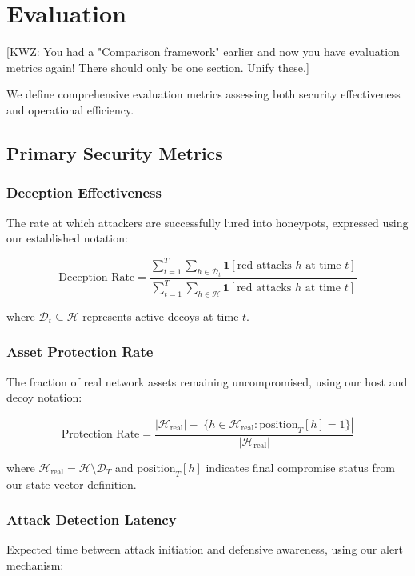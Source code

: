 \documentclass[12pt,oneside]{article}
\newcommand{\kwz}[1]{
  {\color{magenta} [KWZ: {#1}]}
 }
\begin{document}
\section{Evaluation}

\kwz{You had a "Comparison framework" earlier and now you have evaluation metrics again! There should only be one section. Unify these.}

We define comprehensive evaluation metrics assessing both security effectiveness and operational efficiency.

\subsection{Primary Security Metrics}

\subsubsection{Deception Effectiveness}
The rate at which attackers are successfully lured into honeypots, expressed using our established notation:

\begin{equation}
\text{Deception Rate} = \frac{\sum_{t=1}^{T} \sum_{h \in \mathcal{D}_t} \mathbf{1}[\text{red attacks } h \text{ at time } t]}{\sum_{t=1}^{T} \sum_{h \in \mathcal{H}} \mathbf{1}[\text{red attacks } h \text{ at time } t]}
\end{equation}

where $\mathcal{D}_t \subseteq \mathcal{H}$ represents active decoys at time $t$.

\subsubsection{Asset Protection Rate}
The fraction of real network assets remaining uncompromised, using our host and decoy notation:

\begin{equation}
\text{Protection Rate} = \frac{|\mathcal{H}_{\text{real}}| - |\{h \in \mathcal{H}_{\text{real}} : \text{position}_T[h] = 1\}|}{|\mathcal{H}_{\text{real}}|}
\end{equation}

where $\mathcal{H}_{\text{real}} = \mathcal{H} \setminus \mathcal{D}_T$ and $\text{position}_T[h]$ indicates final compromise status from our state vector definition.

\subsubsection{Attack Detection Latency}
Expected time between attack initiation and defensive awareness, using our alert mechanism:
\end{document}
